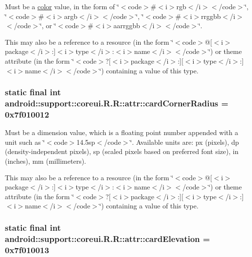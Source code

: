 Must be a \hyperlink{classandroid_1_1support_1_1coreui_1_1_r_1_1color}{color} value, in the form of \char`\"{}$<$code$>$\#$<$i$>$rgb$<$/i$>$$<$/code$>$\char`\"{}, \char`\"{}$<$code$>$\#$<$i$>$argb$<$/i$>$$<$/code$>$\char`\"{}, \char`\"{}$<$code$>$\#$<$i$>$rrggbb$<$/i$>$$<$/code$>$\char`\"{}, or \char`\"{}$<$code$>$\#$<$i$>$aarrggbb$<$/i$>$$<$/code$>$\char`\"{}. 

This may also be a reference to a resource (in the form \char`\"{}$<$code$>$@\mbox{[}$<$i$>$package$<$/i$>$:\mbox{]}$<$i$>$type$<$/i$>$:$<$i$>$name$<$/i$>$$<$/code$>$\char`\"{}) or theme attribute (in the form \char`\"{}$<$code$>$?\mbox{[}$<$i$>$package$<$/i$>$:\mbox{]}\mbox{[}$<$i$>$type$<$/i$>$:\mbox{]}$<$i$>$name$<$/i$>$$<$/code$>$\char`\"{}) containing a value of this type. \hypertarget{classandroid_1_1support_1_1coreui_1_1_r_1_1attr_ea08baf1a63d0a4d6c3cc15627468004}{
\subsubsection[{cardCornerRadius}]{\setlength{\rightskip}{0pt plus 5cm}static final int android::support::coreui.R.R::attr::cardCornerRadius = 0x7f010012}}
\label{classandroid_1_1support_1_1coreui_1_1_r_1_1attr_ea08baf1a63d0a4d6c3cc15627468004}


Must be a dimension value, which is a floating point number appended with a unit such as \char`\"{}$<$code$>$14.5sp$<$/code$>$\char`\"{}. Available units are: px (pixels), dp (density-independent pixels), sp (scaled pixels based on preferred font size), in (inches), mm (millimeters). 

This may also be a reference to a resource (in the form \char`\"{}$<$code$>$@\mbox{[}$<$i$>$package$<$/i$>$:\mbox{]}$<$i$>$type$<$/i$>$:$<$i$>$name$<$/i$>$$<$/code$>$\char`\"{}) or theme attribute (in the form \char`\"{}$<$code$>$?\mbox{[}$<$i$>$package$<$/i$>$:\mbox{]}\mbox{[}$<$i$>$type$<$/i$>$:\mbox{]}$<$i$>$name$<$/i$>$$<$/code$>$\char`\"{}) containing a value of this type. \hypertarget{classandroid_1_1support_1_1coreui_1_1_r_1_1attr_6e41224cafbce3f816b64787cbb05b5c}{
\subsubsection[{cardElevation}]{\setlength{\rightskip}{0pt plus 5cm}static final int android::support::coreui.R.R::attr::cardElevation = 0x7f010013}}
\label{classandroid_1_1support_1_1coreui_1_1_r_1_1attr_6e41224cafbce3f816b64787cbb05b5c}


